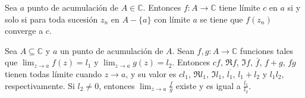 \documentclass[spanish,presentation]{beamer}
\begin{document}
\begin{frame}[label=sec-2-3]{}
\begin{theorem}
Sea \(a\) punto de acumulación de \(A\in \mathbb{C}\). Entonces
\(f\colon A\to \mathbb{C}\) tiene límite \(c\) en \(a\) si y solo
si para toda sucesión \(z_{n}\) en \(A-\{a\}\) con límite \(a\) se
tiene que \(f(z_{n})\) converge a \(c\).
\end{theorem}

\begin{theorem}
Sea \(A\subseteq \mathbb{C}\) y \(a\) un punto de acumulación de
\(A\). Sean \(f,g\colon A\to \mathbb{C}\) funciones tales que
\(\lim_{z\to a}f(z)=l_{1}\) y \(\lim_{z\to
    a}g(z)=l_{2}\). Entonces \(cf\), \(\Re f\), \(\Im f\),
\(\overline{f}\), \(f+g\), \(fg\) tienen todas límite cuando
\(z\to a\), y su valor es \(cl_{1}\), \(\Re l_{1}\), \(\Im
    l_{1}\), \(\overline{l_{1}}\), \(l_{1}+l_{2}\) y \(l_{1}l_{2}\),
respectivamente. Si \(l_{2}\ne 0\), entonces \(\lim_{z\to
    a}\frac{f}{g}\) existe y es igual a \(\frac{l_{1}}{l_{2}}\).
\end{theorem}
\end{frame}
\end{document}
